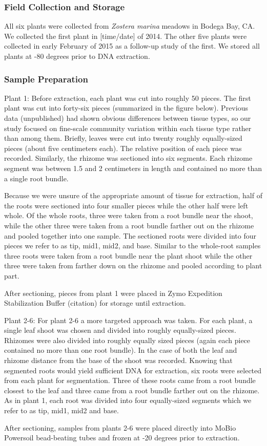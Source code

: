 
\subsubsection{\textbf{Field Collection and Storage}}

    All six plants were collected from \textit{Zostera marina} meadows in Bodega Bay, CA. We collected the first plant in [time/date] of 2014. The other five plants were collected in early February of 2015 as a follow-up study of the first. We stored all plants at -80 degrees prior to DNA extraction. 

\subsubsection{\textbf{Sample Preparation}}
Plant 1:
Before extraction, each plant was cut into roughly 50 pieces. The first plant was cut into forty-six pieces (summarized in the figure below). Previous data (unpublished) had shown obvious differences between tissue types, so our study focused on fine-scale community variation within each tissue type rather than among them. Briefly, leaves were cut into twenty roughly equally-sized pieces (about five centimeters each). The relative position of each piece was recorded. Similarly, the rhizome was sectioned into six segments. Each rhizome segment was between 1.5 and 2 centimeters in length and contained no more than a single root bundle.

Because we were unsure of the appropriate amount of tissue for extraction, half of the roots were sectioned into four smaller pieces while the other half were left whole. Of the whole roots, three were taken from a root bundle near the shoot, while the other three were taken from a root bundle farther out on the rhizome and pooled together into one sample. The sectioned roots were divided into four pieces we refer to as tip, mid1, mid2, and base. Similar to the whole-root samples three roots were taken from a root bundle near the plant shoot while the other three were taken from farther down on the rhizome and pooled according to plant part. 

After sectioning, pieces from plant 1 were placed in Zymo Expedition Stabilization Buffer (citation) for storage until extraction.

Plant 2-6:
For plant 2-6 a more targeted approach was taken. For each plant, a single leaf shoot was chosen and divided into roughly equally-sized pieces. Rhizomes were also divided into roughly equally sized pieces (again each piece contained no more than one root bundle). In the case of both the leaf and rhizome distance from the base of the shoot was recorded. Knowing that segmented roots would yield sufficient DNA for extraction, six roots were selected from each plant for segmentation. Three of these roots came from a root bundle closest to the leaf and three came from a root bundle farther out on the rhizome. As in plant 1, each root was divided into four equally-sized segments which we refer to as tip, mid1, mid2 and base. 

After sectioning, samples from plants 2-6 were placed directly into MoBio Powersoil bead-beating tubes and frozen at -20 degrees prior to extraction.